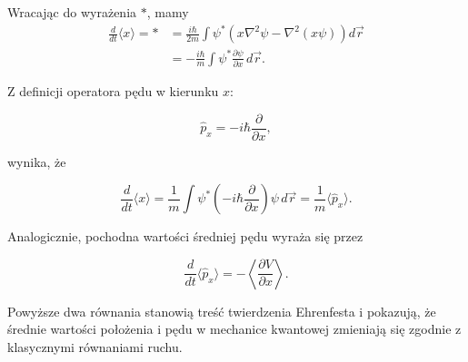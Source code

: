 Wracając do wyrażenia $*$, mamy
\begin{align*}
\frac{d}{dt} \langle x \rangle = * &= \frac{i\hbar}{2m} \int \psi^* \left( x \nabla^2 \psi - \nabla^2 (x \psi) \right) d\vec{r} \\
&= -\frac{i\hbar}{m} \int \psi^* \frac{\partial \psi}{\partial x} \, d\vec{r}.
\end{align*}

Z definicji operatora pędu w kierunku $x$:

$$
\hat{p}_x = -i\hbar \frac{\partial}{\partial x},
$$

wynika, że

$$
\frac{d}{dt} \langle x \rangle = \frac{1}{m} \int \psi^* \left(-i\hbar \frac{\partial}{\partial x}\right) \psi \, d\vec{r} = \frac{1}{m} \langle \hat{p}_x \rangle.
$$

Analogicznie, pochodna wartości średniej pędu wyraża się przez

$$
\frac{d}{dt} \langle \hat{p}_x \rangle = - \left\langle \frac{\partial V}{\partial x} \right\rangle.
$$

Powyższe dwa równania stanowią treść twierdzenia Ehrenfesta i pokazują, że średnie wartości położenia i pędu w mechanice kwantowej zmieniają się zgodnie z klasycznymi równaniami ruchu. 
